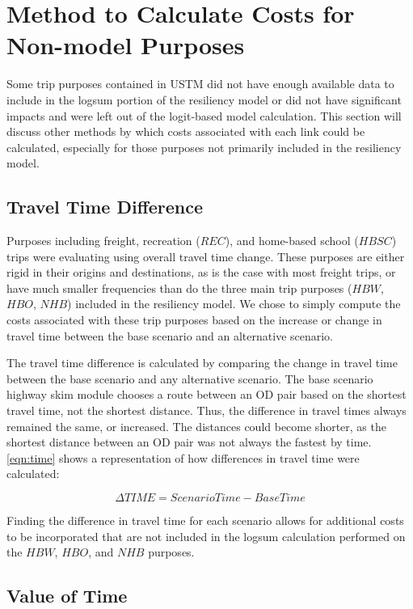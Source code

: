 \section{Method to Calculate Costs for Non-model Purposes}

Some trip purposes contained in USTM did not have enough available data to
include in the logsum portion of the resiliency model or did not have
significant impacts and were left out of the logit-based model
calculation. This section will discuss other methods by which costs
associated with each link could be calculated, especially for those
purposes not primarily included in the resiliency model.

\subsection{Travel Time Difference}

Purposes including freight, recreation ($REC$), and home-based school
($HBSC$) trips were evaluating using overall travel time change. These
purposes are either rigid in their origins and destinations, as is the
case with most freight trips, or have much smaller frequencies than do the
three main trip purposes ($HBW$, $HBO$, $NHB$) included in the resiliency
model. We chose to simply compute the costs associated with these trip
purposes based on the increase or change in travel time between the base
scenario and an alternative scenario.

The travel time difference is calculated by comparing the change in travel
time between the base scenario and any alternative scenario. The base
scenario highway skim module chooses a route between an OD pair based on
the shortest travel time, not the shortest distance. Thus, the difference
in travel times always remained the same, or increased. The distances
could become shorter, as the shortest distance between an OD pair was not
always the fastest by time. \ref{eqn:time} shows a representation of how
differences in travel time were calculated:

\begin{equation}
	\Delta TIME = Scenario Time - Base Time
	\label{eqn:time}
\end{equation}

Finding the difference in travel time for each scenario allows for
additional costs to be incorporated that are not included in the logsum
calculation performed on the $HBW$, $HBO$, and $NHB$ purposes.

\subsection{Value of Time}

